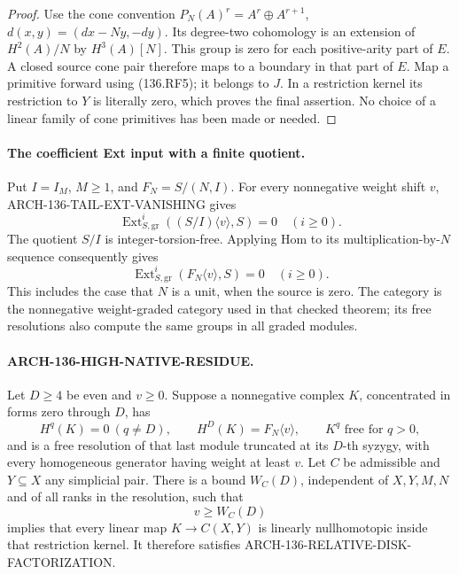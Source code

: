\begin{proof}
Use the cone convention
\(P_N(A)^r=A^r\oplus A^{r+1}\),
\(d(x,y)=(dx-Ny,-dy)\).  Its degree-two cohomology is an
extension of \(H^2(A)/N\) by \(H^3(A)[N]\).
This group is zero for each positive-arity part of \(E\).
A closed source cone pair therefore maps to a boundary in
that part of \(E\).  Map a primitive forward using
(136.RF5); it belongs to \(J\).  In a restriction kernel
its restriction to \(Y\) is literally zero, which proves
the final assertion.  No choice of a linear family of cone
primitives has been made or needed.
\end{proof}

\paragraph{The coefficient Ext input with a finite quotient.}
Put \(I=I_M\), \(M\geq1\), and
\(F_N=S/(N,I)\).  For every nonnegative weight shift
\(v\), ARCH-136-TAIL-EXT-VANISHING gives
\[
 \operatorname{Ext}^i_{S,\mathrm{gr}}
             ((S/I)\langle v\rangle,S)=0\quad(i\geq0).
\]
The quotient \(S/I\) is integer-torsion-free.  Applying
Hom to its multiplication-by-\(N\) sequence consequently gives
\[
 \operatorname{Ext}^i_{S,\mathrm{gr}}
              (F_N\langle v\rangle,S)=0\quad(i\geq0).
                                                               \tag{136.RF7}
\]
This includes the case that \(N\) is a unit, when the source
is zero.  The category is the nonnegative weight-graded category
used in that checked theorem; its free resolutions also compute
the same groups in all graded modules.

\paragraph{ARCH-136-HIGH-NATIVE-RESIDUE.}
Let \(D\geq4\) be even and \(v\geq0\).  Suppose a nonnegative complex
\(K\), concentrated in forms zero through \(D\), has
\[
 H^q(K)=0\ (q\ne D),\qquad
 H^D(K)=F_N\langle v\rangle,\qquad K^q\text{ free for }q>0,
                                                               \tag{136.RF8}
\]
and is a free resolution of that last module truncated at its
\(D\)-th syzygy, with every homogeneous generator having
weight at least \(v\).  Let \(C\) be admissible and
\(Y\subseteq X\) any simplicial pair.  There is a bound
\(W_C(D)\), independent of \(X,Y,M,N\) and of all ranks
in the resolution, such that
\[
                          v\geq W_C(D)                 \tag{136.RF9}
\]
implies that every linear map \(K\to C(X,Y)\) is
linearly nullhomotopic inside that restriction kernel.
It therefore satisfies ARCH-136-RELATIVE-DISK-FACTORIZATION.

